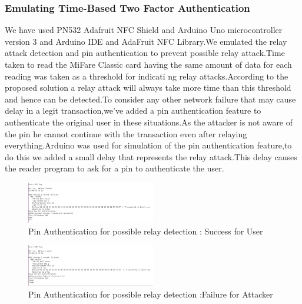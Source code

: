 \documentclass[conference]{IEEEtran}
\begin{document}
\subsubsection{Emulating Time-Based Two Factor Authentication}
We have used PN532 Adafruit NFC Shield and Arduino Uno microcontroller version 3 and Arduino IDE and AdaFruit NFC Library.We  emulated the relay attack detection and pin authentication to prevent possible relay attack.Time taken to read the MiFare Classic card having the same amount of data for each reading was taken as a threshold for indicati ng relay attacks.According to the proposed solution a relay attack will always take more time than this threshold and hence can be detected.To consider any other network failure 
that may cause delay in a legit transaction,we've added a pin authentication feature to authenticate the original user in these situations.As the attacker is not aware of the pin he cannot continue with the transaction even after relaying everything.Arduino was used for simulation of  the pin authentication feature,to do this we added a small delay that represents the relay attack.This delay causes the reader program to ask for a pin to authenticate the user. 
\begin{figure}[h]
\includegraphics[width=0.5\textwidth,height=0.2\textheight]{spin}
\caption{Pin Authentication for possible relay detection : Success for User}
\end{figure}
\begin{figure}[h]
\includegraphics[width=0.5\textwidth,height=0.2\textheight]{fpin}
\caption{Pin Authentication for possible relay detection :Failure for Attacker}
\end{figure}
\end{document}
